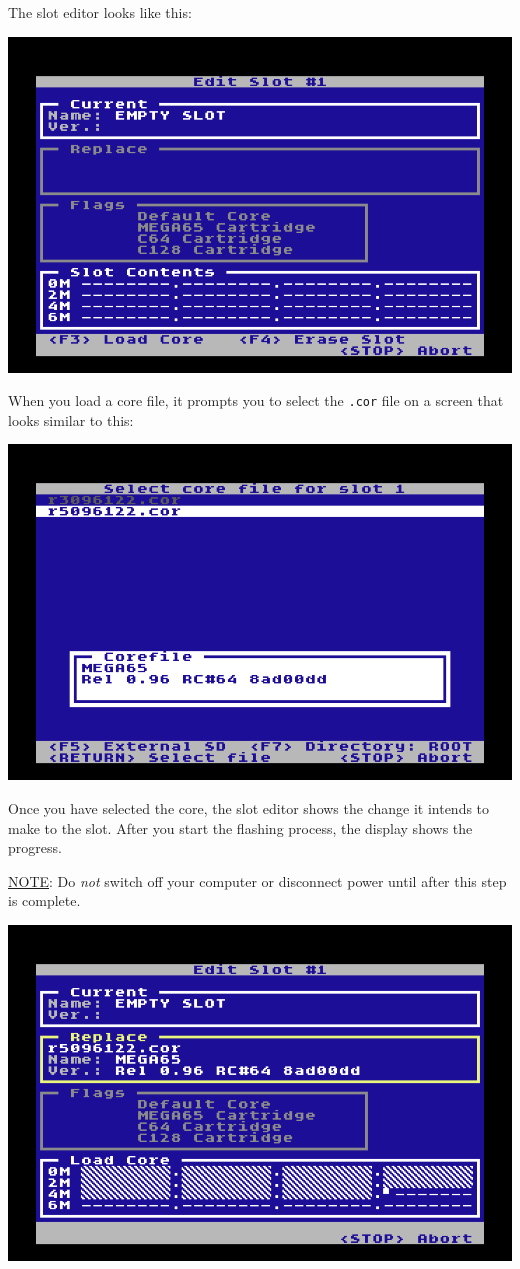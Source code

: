 The slot editor looks like this:

\begin{center}
  \includegraphics[width=0.7\linewidth]{images/ss-flashmenu-sloteditor.png}
\end{center}

When you load a core file, it prompts you to select the {\tt .cor} file on a screen that looks similar to this:

\begin{center}
  \includegraphics[width=0.7\linewidth]{images/ss-flashmenu-selectcore.png}
\end{center}

Once you have selected the core, the slot editor shows the change it intends to make to the slot. After you start the flashing process, the display shows the progress.

\underline{NOTE}: Do {\em not} switch off your computer or disconnect power until after this step is complete.

\begin{center}
  \includegraphics[width=0.7\linewidth]{images/ss-flashmenu-loading.png}
\end{center}

